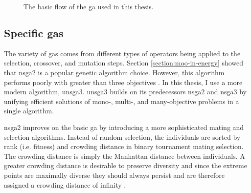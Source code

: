 \begin{figure}[ht]
        \centering
        \caption{The basic flow of the \ac{ga} used in this thesis.}
        \label{fig:genetic-alg}
\end{figure}

\subsection{Specific \Aclp{ga}}
The variety of \acp{ga} comes from different types of operators being applied to 
the selection, crossover, and mutation steps. Section \ref{section:moo-in-energy} 
showed that \ac{nsga2} is a popular genetic algorithm choice. However, this algorithm
performs poorly with greater than three objectives \cite{deb_fast_2002, seada_unified_2016}. In this thesis, I use a more modern algorithm, 
\ac{unsga3}. \ac{unsga3} builds on its predecessors \ac{nsga2} and \ac{nsga3} by unifying
efficient solutions of mono-, multi-, and many-objective problems in a single algorithm.


\ac{nsga2} improves on the basic \ac{ga} by introducing a more sophisticated mating and 
selection algorithms. Instead of random selection, the individuals are sorted by rank 
(i.e. fitness) and crowding distance in binary tournament mating selection. The crowding 
distance is simply the Manhattan distance between individuals. A greater crowding 
distance is desirable to preserve diversity and since the extreme points are maximally 
diverse they should always persist and are therefore assigned a crowding distance of 
infinity \cite{deb_fast_2002}.

